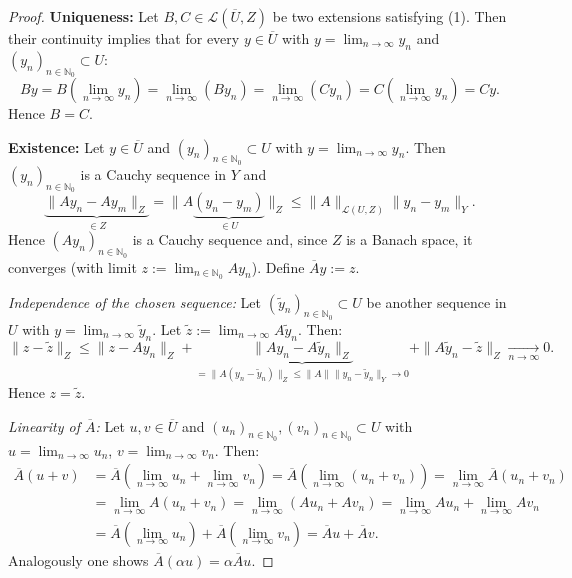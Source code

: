 \documentclass[12pt]{article}
\begin{document}
\begin{proof}
\textbf{Uniqueness:}
Let $B,C\in\mathcal L(\overline{U},Z)$ be two extensions satisfying (1). Then their continuity implies
that for every $y\in\overline{U}$ with $y=\lim_{n\to\infty}y_n$ and $(y_n)_{n\in\mathbb N_0}\subset U$:
\[
By=B\!\left(\lim_{n\to\infty}y_n\right)=\lim_{n\to\infty}(By_n)=\lim_{n\to\infty}(Cy_n)=C\!\left(\lim_{n\to\infty}y_n\right)=Cy.
\]
Hence $B=C$.

\medskip
\textbf{Existence:}
Let $y\in\overline{U}$ and $(y_n)_{n\in\mathbb N_0}\subset U$ with $y=\lim_{n\to\infty}y_n$.
Then $(y_n)_{n\in\mathbb N_0}$ is a Cauchy sequence in $Y$ and
\[
\underbrace{\|Ay_n-Ay_m\|_Z}_{\in Z}
=\|A\underbrace{(y_n-y_m)}_{\in U}\|_Z
\le\|A\|_{\mathcal L(U,Z)}\|y_n-y_m\|_Y.
\]
Hence $(Ay_n)_{n\in\mathbb N_0}$ is a Cauchy sequence and, since $Z$ is a Banach space, it converges
(with limit $z:=\lim_{n\in\mathbb N_0}Ay_n$). Define $\overline{A}y:=z$.

\medskip
\textit{Independence of the chosen sequence:}
Let $(\tilde y_n)_{n\in\mathbb N_0}\subset U$ be another sequence in $U$ with $y=\lim_{n\to\infty}\tilde y_n$.
Let $\tilde z:=\lim_{n\to\infty}A\tilde y_n$. Then:
\[
\|z-\tilde z\|_Z
\le\|z-Ay_n\|_Z
+\underbrace{\|Ay_n-A\tilde y_n\|_Z}_{=\|A(y_n-\tilde y_n)\|_Z\le\|A\|\|y_n-\tilde y_n\|_Y\to 0}
+\|A\tilde y_n-\tilde z\|_Z
\xrightarrow[n\to\infty]{}0.
\]
Hence $z=\tilde z$.

\medskip
\textit{Linearity of\/ $\overline{A}$:}
Let $u,v\in\overline{U}$ and $(u_n)_{n\in\mathbb N_0},(v_n)_{n\in\mathbb N_0}\subset U$ with $u=\lim_{n\to\infty}u_n$,
$v=\lim_{n\to\infty}v_n$. Then:
\begin{align*}
\overline{A}(u+v)
&=\overline{A}\!\left(\lim_{n\to\infty}u_n+\lim_{n\to\infty}v_n\right)
=\overline{A}\!\left(\lim_{n\to\infty}(u_n+v_n)\right)
=\lim_{n\to\infty}\overline{A}(u_n+v_n)\\
&=\lim_{n\to\infty}A(u_n+v_n)
=\lim_{n\to\infty}(Au_n+Av_n)
=\lim_{n\to\infty}Au_n+\lim_{n\to\infty}Av_n \tag{7.1.1}\\
&=\overline{A}\!\left(\lim_{n\to\infty}u_n\right)+\overline{A}\!\left(\lim_{n\to\infty}v_n\right)
=\overline{A}u+\overline{A}v.
\end{align*}
Analogously one shows $\overline{A}(\alpha u)=\alpha\overline{A}u$.


\end{proof}
\end{document}
